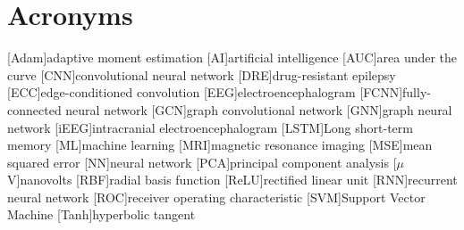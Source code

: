 
\chapter{Acronyms} \label{chap: Acronyms}

\begin{acronym}[AAAAA]
    [Adam]{adaptive moment estimation}
    [AI]{artificial intelligence}
    [AUC]{area under the curve}
    [CNN]{convolutional neural network}
    [DRE]{drug-resistant epilepsy}
    [ECC]{edge-conditioned convolution}
    [EEG]{electroencephalogram}
    [FCNN]{fully-connected neural network}
    [GCN]{graph convolutional network}
    [GNN]{graph neural network}
    [iEEG]{intracranial electroencephalogram}
    [LSTM]{Long short-term memory}
    [ML]{machine learning}
    [MRI]{magnetic resonance imaging}
    [MSE]{mean squared error}
    [NN]{neural network}
    [PCA]{principal component analysis}
    [$\mu$V]{nanovolts}
    [RBF]{radial basis function}
    [ReLU]{rectified linear unit}
    [RNN]{recurrent neural network}
    [ROC]{receiver operating characteristic}
    [SVM]{Support Vector Machine}
    [Tanh]{hyperbolic tangent}
\end{acronym}
